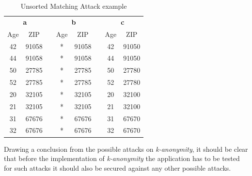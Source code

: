 \documentclass{llncs}
\begin{document}
\begin{table}[]
	\centering
	\caption{Unsorted Matching Attack example}
	\label{MatchingAttack}
	\begin{tabular}{@{}cccccccc@{}}
		\multicolumn{2}{c}{\textbf{a}} & \multicolumn{1}{l}{} & \multicolumn{2}{c}{\textbf{b}} & \multicolumn{1}{l}{} & \multicolumn{2}{c}{\textbf{c}} \\ \cline{1-2} \cline{4-5} \cline{7-8} 
		Age           & ZIP            &                      & Age           & ZIP            &                      & Age           & ZIP            \\ \cline{1-2} \cline{4-5} \cline{7-8} 
		42            & 91058          &                      & *             & 91058          &                      & 42            & 91050          \\
		44            & 91058          &                      & *             & 91058          &                      & 44            & 91050          \\
		50            & 27785          &                      & *             & 27785          &                      & 50            & 27780          \\
		52            & 27785          &                      & *             & 27785          &                      & 52            & 27780          \\
		20            & 32105          &                      & *             & 32105          &                      & 20            & 32100          \\
		21            & 32105          &                      & *             & 32105          &                      & 21            & 32100          \\
		31            & 67676          &                      & *             & 67676          &                      & 31            & 67670          \\
		32            & 67676          &                      & *             & 67676          &                      & 32            & 67670          \\ \cline{1-2} \cline{4-5} \cline{7-8} 
	\end{tabular}
\end{table}

Drawing a conclusion from the possible attacks on \textit{k-anonymity}, it should be clear that before the implementation of \textit{k-anonymity} the application has to be tested for such attacks it should also be secured against any other possible attacks.
\end{document}
